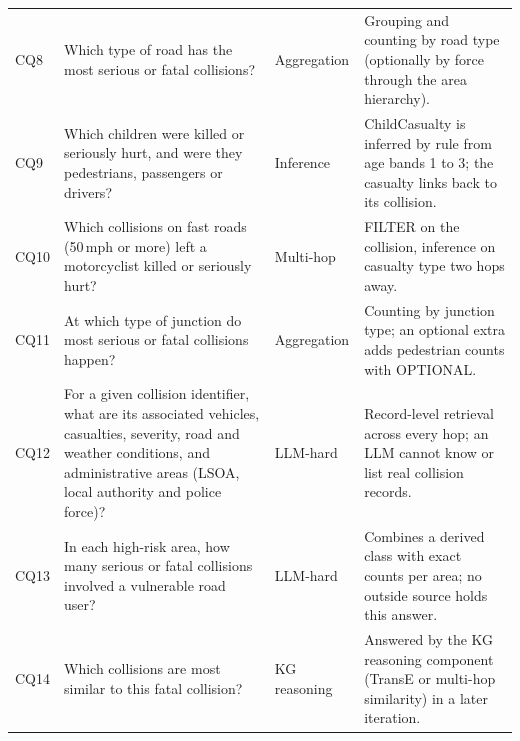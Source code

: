 \documentclass[11pt,a4paper]{article}
\newcommand{\cls}[1]{\textsf{#1}}
\begin{document}
\begin{longtable}{L{0.9cm} L{6.0cm} L{2.1cm} L{6.6cm}}
CQ8 & Which type of road has the most serious or fatal collisions? & Aggregation & Grouping and counting by road type (optionally by force through the area hierarchy).\\
CQ9 & Which children were killed or seriously hurt, and were they pedestrians, passengers or drivers? & Inference & \cls{ChildCasualty} is inferred by rule from age bands 1 to 3; the casualty links back to its collision.\\
CQ10 & Which collisions on fast roads (50\,mph or more) left a motorcyclist killed or seriously hurt? & Multi-hop & FILTER on the collision, inference on casualty type two hops away.\\
CQ11 & At which type of junction do most serious or fatal collisions happen? & Aggregation & Counting by junction type; an optional extra adds pedestrian counts with OPTIONAL.\\
CQ12 & For a given collision identifier, what are its associated vehicles, casualties, severity, road and weather conditions, and administrative areas (LSOA, local authority and police force)? & LLM-hard & Record-level retrieval across every hop; an LLM cannot know or list real collision records.\\
CQ13 & In each high-risk area, how many serious or fatal collisions involved a vulnerable road user? & LLM-hard & Combines a derived class with exact counts per area; no outside source holds this answer.\\
CQ14 & Which collisions are most similar to this fatal collision? & KG reasoning & Answered by the KG reasoning component (TransE or multi-hop similarity) in a later iteration.\\
\bottomrule
\end{longtable}
\normalsize
\clearpage
\end{document}
